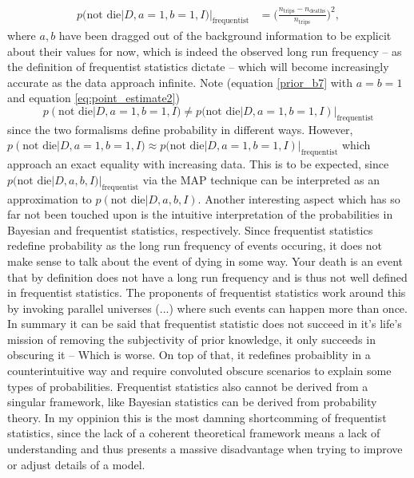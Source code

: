 \begin{example}
	\begin{equation}
		\begin{split}
			p(\text{not die}|D,a=1,b=1,I)|_{\text{frequentist}} &= \bigg(\frac{n_{\text{trips}}-n_{\text{deaths}}}{n_{\text{trips}}}\bigg)^2,
		\end{split}
		\label{eq:point_estimate2}
	\end{equation}
	where $a,b$ have been dragged out of the background information to be explicit about their values for now, which is indeed the observed long run frequency -- as the definition of frequentist statistics dictate -- which will become increasingly accurate as the data approach infinite. Note (equation \eqref{prior_b7} with $a=b=1$ and equation \eqref{eq:point_estimate2})
	\begin{equation}
		p(\text{not die}|D,a=1,b=1,I) \neq p(\text{not die}|D,a=1,b=1,I)|_{\text{frequentist}}
	\end{equation}
	since the two formalisms define probability in different ways. However, $p(\text{not die}|D,a=1,b=1,I) \approx p(\text{not die}|D,a=1,b=1,I)|_{\text{frequentist}}$ which approach an exact equality with increasing data. This is to be expected, since $p(\text{not die}|D,a,b,I)|_{\text{frequentist}}$ via the MAP technique can be interpreted as an approximation to $p(\text{not die}|D,a,b,I)$.\newline
	Another interesting aspect which has so far not been touched upon is the intuitive interpretation of the probabilities in Bayesian and frequentist statistics, respectively. Since frequentist statistics redefine probability as the long run frequency of events occuring, it does not make sense to talk about the event of dying in some way. Your death is an event that by definition does not have a long run frequency and is thus not well defined in frequentist statistics. The proponents of frequentist statistics work around this by invoking parallel universes (...) where such events can happen more than once.\newline
	In summary it can be said that frequentist statistic does not succeed in it's life's mission of removing the subjectivity of prior knowledge, it only succeeds in obscuring it -- Which is worse. On top of that, it redefines probaiblity in a counterintuitive way and require convoluted obscure scenarios to explain some types of probabilities. Frequentist statistics also cannot be derived from a singular framework, like Bayesian statistics can be derived from probability theory. In my oppinion this is the most damning shortcomming of frequentist statistics, since the lack of a coherent theoretical framework means a lack of understanding and thus presents a massive disadvantage when trying to improve or adjust details of a model.  
\end{example}



